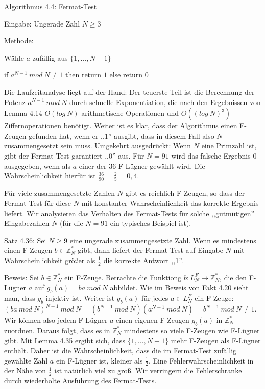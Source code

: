 \documentclass[a4paper]{article}
\begin{document}
\begin{multicols}{3}
        Algorithmus 4.4: Fermat-Test
        \begin{itemize*}
            \item Eingabe: Ungerade Zahl $N\geq 3$
            \item Methode:
            \begin{enumerate*}
                \item Wähle $a$ zufällig aus $\{1,...,N-1\}$
                \item if $a^{N-1}\ mod\ N\not= 1$ then return $1$ else return $0$
            \end{enumerate*}
        \end{itemize*}

        Die Laufzeitanalyse liegt auf der Hand: Der teuerste Teil ist die Berechnung der Potenz $a^{N-1}\ mod\ N$ durch schnelle Exponentiation, die nach den Ergebnissen von Lemma 4.14 $O(log\ N)$ arithmetische Operationen und $O((log\ N)^3)$ Ziffernoperationen benötigt. Weiter ist es klar, dass der Algorithmus einen F-Zeugen gefunden hat, wenn er ,,1'' ausgibt, dass in diesem Fall also $N$ zusammengesetzt sein muss. Umgekehrt ausgedrückt: Wenn $N$ eine Primzahl ist, gibt der Fermat-Test garantiert ,,0'' aus. Für $N=91$ wird das falsche Ergebnis $0$ ausgegeben, wenn als $a$ einer der 36 F-Lügner gewählt wird. Die Wahrscheinlichkeit hierfür ist $\frac{36}{90} =\frac{2}{5} = 0,4$.

        Für viele zusammengesetzte Zahlen $N$ gibt es reichlich F-Zeugen, so dass der Fermat-Test für diese $N$ mit konstanter Wahrscheinlichkeit das korrekte Ergebnis liefert. Wir analysieren das Verhalten des Fermat-Tests für solche ,,gutmütigen'' Eingabezahlen $N$ (für die $N=91$ ein typisches Beispiel ist).

        Satz 4.36: Sei $N\geq 9$ eine ungerade zusammengesetzte Zahl. Wenn es mindestens einen F-Zeugen $b\in\mathbb{Z}^*_N$ gibt, dann liefert der Fermat-Test auf Eingabe $N$ mit Wahrscheinlichkeit größer als $\frac{1}{2}$ die korrekte Antwort ,,1''.

        Beweis: Sei $b\in\mathbb{Z}^*_N$ ein F-Zeuge. Betrachte die Funktiong $b:L^F_N\rightarrow\mathbb{Z}^*_N$, die den F-Lügner $a$ auf $g_b(a) =ba\ mod\ N$ abbildet. Wie im Beweis von Fakt 4.20 sieht man, dass $g_b$ injektiv ist. Weiter ist $g_b(a)$ für jedes $a\in L^F_N$ ein F-Zeuge: $(ba\ mod\ N)^{N-1}\ mod\ N= (b^{N-1}\ mod\ N)(a^{N-1}\ mod\ N) =b^{N-1}\ mod\ N\not= 1$.
        Wir können also jedem F-Lügner $a$ einen eigenen F-Zeugen $g_b(a)$ in $\mathbb{Z}^*_N$ zuordnen. Daraus folgt, dass es in $\mathbb{Z}^*_N$ mindestens so viele F-Zeugen wie F-Lügner gibt. Mit Lemma 4.35 ergibt sich, dass $\{1,...,N-1\}$ mehr F-Zeugen als F-Lügner enthält. Daher ist die Wahrscheinlichkeit, dass die im Fermat-Test zufällig gewählte Zahl $a$ ein F-Lügner ist, kleiner als $\frac{1}{2}$.
        Eine Fehlerwahrscheinlichkeit in der Nähe von $\frac{1}{2}$ ist natürlich viel zu groß. Wir verringern die Fehlerschranke durch wiederholte Ausführung des Fermat-Tests.


\end{multicols}
\end{document}
